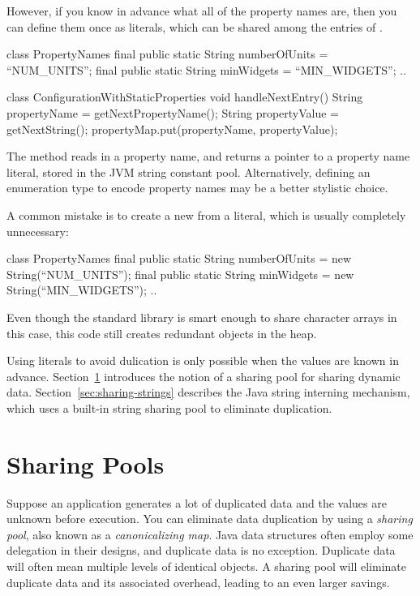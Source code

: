 However, if you know in advance what all of the property names are, then you can
define them once as  literals, which can be shared among the
entries of .
\begin{shortlisting}
class PropertyNames {
	final public static String numberOfUnits = ``NUM_UNITS'';
	final public static String minWidgets = ``MIN_WIDGETS'';
	..
}

class ConfigurationWithStaticProperties {
    void handleNextEntry() {
       String propertyName = getNextPropertyName(); 
       String propertyValue = getNextString();
       propertyMap.put(propertyName, propertyValue);
    }
}
\end{shortlisting}
The  method reads in a property name, and returns
a pointer to a property name literal, stored in the JVM string
constant pool. Alternatively, defining an enumeration
type to encode property names may be a better stylistic choice.

A common
 mistake is to create a new   from a  literal,
 which is usually completely unnecessary:
\begin{shortlisting}
class PropertyNames {
	final public static String numberOfUnits = 
	                           new String(``NUM_UNITS'');
	final public static String minWidgets = 
	                           new String(``MIN_WIDGETS'');
	..
}
\end{shortlisting}
Even though the standard library is smart enough to share
character arrays in this case, this code still creates redundant 
objects in the heap.

Using  literals to avoid dulication is only possible when the
 values are known in advance. 
Section~\ref{sec:sharing-pools} introduces the notion of a sharing pool for
sharing dynamic data. Section~\ref{sec:sharing-strings} describes the Java
string interning mechanism, which uses a built-in string sharing pool to
eliminate duplication.

\section{Sharing Pools}
\label{sec:sharing-pools}

Suppose an application generates a lot of duplicated data and the values
are unknown before execution. 
You can eliminate data duplication by using a \emph{sharing pool}, also known
as a \emph{canonicalizing map}. Java data structures often employ 
some delegation in their designs, and duplicate data is no exception.  Duplicate
data will often mean multiple levels of identical objects.  A sharing pool will
eliminate duplicate data and its associated overhead, leading to an even larger
savings.

